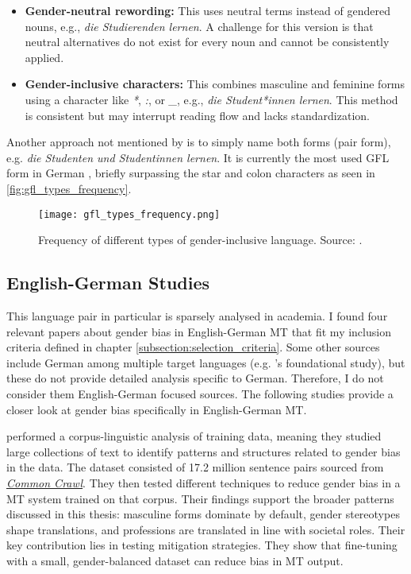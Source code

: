 \begin{itemize}
    \item \textbf{Gender-neutral rewording:}  
    This uses neutral terms instead of gendered nouns, e.g., \textit{die Studierenden lernen}. A challenge for this version is that neutral alternatives do not exist for every noun and cannot be consistently applied.

    \item \textbf{Gender-inclusive characters:}  
    This combines masculine and feminine forms using a character like \textit{*}, \textit{:}, or \textit{\_}, e.g., \textit{die Student*innen lernen}. This method is consistent but may interrupt reading flow and lacks standardization.
\end{itemize}

\noindent Another approach not mentioned by \citeauthor{lardelliBuildingBridgesDataset2024} is to simply name both forms (pair form), e.g. \textit{die Studenten und Studentinnen lernen}. It is currently the most used GFL form in German \citep{waldendorfWordsChangeIncrease2024}, briefly surpassing the star and colon characters as seen in \autoref{fig:gfl_types_frequency}.

\begin{figure}
	\centering
		\texttt{[image: gfl\_types\_frequency.png]}
	\caption{Frequency of different types of gender-inclusive language. Source: \citet{waldendorfWordsChangeIncrease2024}.}
	\label{fig:gfl_types_frequency}
\end{figure}


\subsection{English-German Studies}
This language pair in particular is sparsely analysed in academia. I found four relevant papers about gender bias in English-German MT that fit my inclusion criteria defined in chapter \ref{subsection:selection_criteria}. Some other sources include German among multiple target languages (e.g. \citeauthor{stanovskyEvaluatingGenderBias2019}'s foundational study), but these do not provide detailed analysis specific to German. Therefore, I do not consider them English-German focused sources. The following studies provide a closer look at gender bias specifically in English-German MT.

\textbf{\cite{ullmannGenderBiasMachine2022}} performed a corpus-linguistic analysis of training data, meaning they studied large collections of text to identify patterns and structures related to gender bias in the data. The dataset consisted of 17.2 million sentence pairs sourced from \href{https://commoncrawl.org/}{\textit{Common Crawl}}. They then tested different techniques to reduce gender bias in a MT system trained on that corpus. Their findings support the broader patterns discussed in this thesis: masculine forms dominate by default, gender stereotypes shape translations, and professions are translated in line with societal roles. Their key contribution lies in testing mitigation strategies. They show that fine-tuning with a small, gender-balanced dataset can reduce bias in MT output. 

